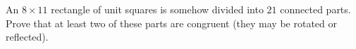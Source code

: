 An $8 \times 11$ rectangle of unit squares is somehow divided into $21$ connected parts.
Prove that at least two of these parts are congruent (they may be rotated or reflected).